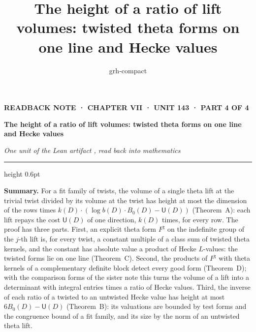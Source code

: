 \documentclass[11pt,a4paper]{article}
\title{The height of a ratio of lift volumes: twisted theta forms on one line and Hecke values}
\author{grh-compact}
\date{}
\newcommand{\m}[1]{\mbox{$#1$}}        %
\theoremstyle{plainx}
\theoremstyle{uprightx}
\begin{document}
\color{ink}

{\raggedright
{\sffamily\bfseries\fontsize{7.2}{9}\selectfont\color{leancol}READBACK NOTE · CHAPTER VII · UNIT 143 · PART 4 OF 4\par}
\vspace{5pt}
{\fontsize{21.5}{25.5}\selectfont\bfseries The height of a ratio of lift volumes: twisted theta forms on one line and
Hecke values\par}
\vspace{5pt}
{\fontsize{12.4}{16}\selectfont\itshape\color{inksoft} One unit of the Lean artifact \ArtifactName, read back into
mathematics\par}}
\vspace{8pt}
{\color{rulegrey}\hrule height 0.6pt}
\vspace{7pt}
\thispagestyle{empty}

\textbf{Summary.} For a fit family of twists, the volume of a single theta lift at the trivial twist divided by
its volume at the twist has height at most the dimension of the rows times
$k(D)\cdot(\log b(D)\cdot B_0(D)-\mathsf{U}(D))$ (Theorem~A): each lift repays the cost \m{\mathsf{U}(D)} of one direction, $k(D)$ times, for every row. The proof
has three parts. First, an explicit theta form \m{F^{\natural}} on the indefinite group of the $j$-th lift is, for
every twist, a constant multiple of a class sum of twisted theta kernels, and the constant has absolute value a
product of Hecke $L$-values: the twisted forms lie on one line (Theorem~C). Second, the products of
\m{F^{\natural}} with theta kernels of a complementary definite block detect every good form (Theorem~D); with the
comparison forms of the sister note this turns the volume of a lift into a determinant with integral entries
times a ratio of Hecke values. Third, the inverse of each ratio of a twisted to an untwisted Hecke value has height
at most \m{6B_0(D)-\mathsf{U}(D)} (Theorem~B): its valuations are bounded by test forms and the congruence bound of a
fit family, and its size by the norm of an untwisted theta lift.
\end{document}
